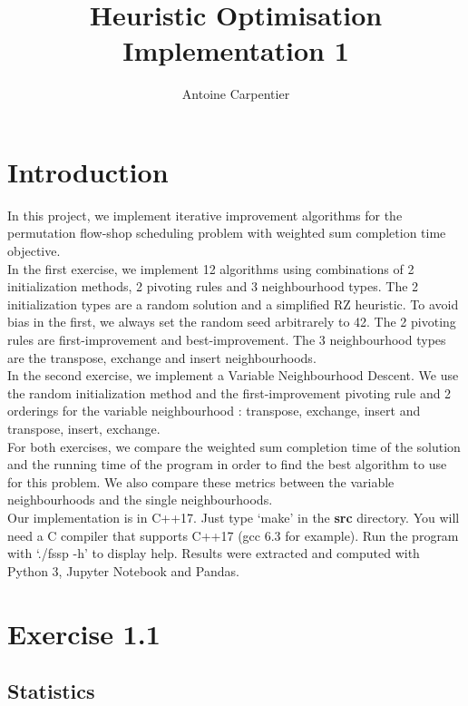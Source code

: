 \documentclass[a4paper,10pt]{article}
\title{Heuristic Optimisation\\Implementation 1}
\author{Antoine Carpentier}
\begin{document}
\maketitle

\section{Introduction}

In this project, we implement iterative improvement algorithms for the permutation flow-shop scheduling problem with weighted sum completion time objective. \\

In the first exercise, we implement 12 algorithms using combinations of 2 initialization methods, 2 pivoting rules and 3 neighbourhood types. The 2 initialization types are a random solution and a simplified RZ heuristic. To avoid bias in the first, we always set the random seed arbitrarely to 42. The 2 pivoting rules are first-improvement and best-improvement. The 3 neighbourhood types are the transpose, exchange and insert neighbourhoods. \\

In the second exercise, we implement a Variable Neighbourhood Descent. We use the random initialization method and the first-improvement pivoting rule and 2 orderings for the variable neighbourhood : transpose, exchange, insert and transpose, insert, exchange. \\

For both exercises, we compare the weighted sum completion time of the solution and the running time of the program in order to find the best algorithm to use for this problem. We also compare these metrics between the variable neighbourhoods and the single neighbourhoods. \\

Our implementation is in C++17. Just type `make' in the \textbf{src} directory. You will need a C compiler that supports C++17 (gcc 6.3 for example). Run the program with `./fssp -h' to display help. Results were extracted and computed with Python 3, Jupyter Notebook and Pandas.

\section{Exercise 1.1}

\subsection{Statistics}
\end{document}
